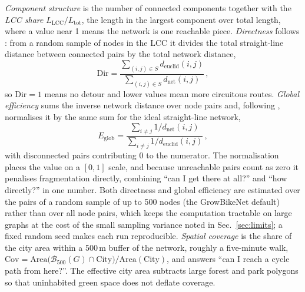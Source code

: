 \documentclass[11pt,a4paper]{article}
\begin{document}
\emph{Component structure} is the number of connected components together with the
\emph{LCC share} \(L_{\mathrm{LCC}}/L_{\mathrm{tot}}\), the length in the largest component
over total length, where a value near 1 means the network is one reachable piece.
\emph{Directness} follows \citet{szell2022}: from a random sample of nodes in the LCC it
divides the total straight-line distance between connected pairs by the total network
distance,
\begin{equation}
\mathrm{Dir} = \frac{\sum_{(i,j)\in S} d_{\mathrm{euclid}}(i,j)}{\sum_{(i,j)\in S} d_{\mathrm{net}}(i,j)}\,,
\end{equation}
so \(\mathrm{Dir}=1\) means no detour and lower values mean more circuitous routes.
\emph{Global efficiency} \citep{latora2001} sums the inverse network distance over node
pairs and, following \citet{szell2022}, normalises it by the same sum for the ideal
straight-line network,
\begin{equation}
E_{\mathrm{glob}} = \frac{\sum_{i\neq j} 1/d_{\mathrm{net}}(i,j)}{\sum_{i\neq j} 1/d_{\mathrm{euclid}}(i,j)}\,,
\end{equation}
with disconnected pairs contributing \(0\) to the numerator. The normalisation places the
value on a \([0,1]\) scale, and because unreachable pairs count as zero it penalises
fragmentation directly, combining ``can I get there at all?'' and ``how directly?'' in one
number. Both directness and global efficiency are estimated over the pairs of a random sample of up
to 500 nodes (the GrowBikeNet default) rather than over all node pairs, which keeps the
computation tractable on large graphs at the cost of the small sampling variance noted in
Sec.~\ref{sec:limits}; a fixed random seed makes each run reproducible. \emph{Spatial
coverage} is the share of the city area within a 500\,m buffer of the
network, roughly a five-minute walk,
\(\mathrm{Cov}=\mathrm{Area}\!\big(\mathcal{B}_{500}(G)\cap\text{City}\big)/\mathrm{Area}(\text{City})\),
and answers ``can I reach a cycle path from here?''. The effective city area subtracts
large forest and park polygons so that uninhabited green space does not deflate coverage.
\end{document}
